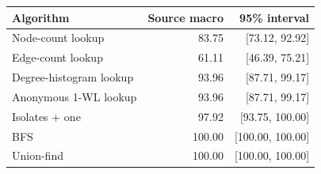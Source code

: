 \begin{tabular}{@{}lrr@{}}
\toprule
Algorithm & Source macro & 95\% interval\\
\midrule
Node-count lookup & 83.75 & [73.12, 92.92]\\
Edge-count lookup & 61.11 & [46.39, 75.21]\\
Degree-histogram lookup & 93.96 & [87.71, 99.17]\\
Anonymous 1-WL lookup & 93.96 & [87.71, 99.17]\\
Isolates + one & 97.92 & [93.75, 100.00]\\
BFS & 100.00 & [100.00, 100.00]\\
Union-find & 100.00 & [100.00, 100.00]\\
\bottomrule
\end{tabular}
